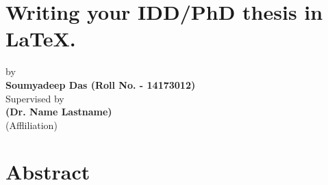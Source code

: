 \documentclass[11pt,a4paper]{article}
\begin{document}
	\section*{ \centering \Large Writing your IDD/PhD thesis in \LaTeX.}
	{\centering
	by\\
	\textbf{Soumyadeep Das (Roll No. - 14173012)}\\
	Supervised by\\
	\textbf{(Dr. Name Lastname)}\\
	(Affliliation)

	}
	
	\doublespacing
	\section*{\centering Abstract}
	
\end{document}

